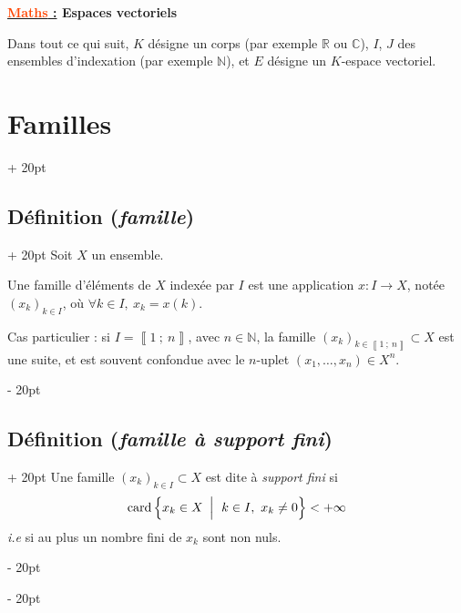\documentclass[a4paper, 12pt, twoside]{article}
\renewcommand{\emph}{\textcolor{ff4500}}
\newcommand{\N}{\mathbb{N}} %
\newcommand{\R}{\mathbb{R}} %
\newcommand{\C}{\mathbb{C}} %
\newcommand{\nset}[2]{\left\llbracket #1\ ;\ #2 \right\rrbracket}
\newcommand{\set}[1]{\left\{ #1 \right\}}
\newcommand{\ind}[1][20pt]{\advance\leftskip + #1}
\newcommand{\deind}[1][20pt]{\advance\leftskip - #1}
\newenvironment{indt}[2][20pt]{#2 \par \ind[#1]}{\par \deind} %
\newcommand{\thetitle}[2]{\begin{center}\textbf{{\LARGE \underline{\emph{#1} :}} {\Large #2}}\end{center}}
\begin{document}
    
    
    \thetitle{Maths}{Espaces vectoriels}
    
    \tableofcontents
    \newpage
    
    
    Dans tout ce qui suit, $K$ désigne un corps (par exemple $\R$ ou $\C$), $I$, $J$ des ensembles d'indexation (par exemple $\N$), et $E$ désigne un $K$-espace vectoriel.
    
    
    
    \begin{indt}{\section{Familles}}
        
        \begin{indt}{\subsection{Définition (\textit{famille})}}
            Soit $X$ un ensemble.
            
            Une famille d'éléments de $X$ indexée par $I$ est une application $x : I \longrightarrow X$, notée $(x_k)_{k \in I}$, où $\forall k \in I,\ x_k = x(k)$.
            
            \vspace{6pt}
            
            Cas particulier : si $I = \nset 1 n$, avec $n \in \N$, la famille $(x_k)_{k \in \nset 1 n} \subset X$ est une suite, et est souvent confondue avec le $n$-uplet $(x_1, \ldots, x_n) \in X^n$.
        \end{indt}
        
        \vspace{12pt}
        
        \begin{indt}{\subsection{Définition (\textit{famille à support fini})}}
            Une famille $(x_k)_{k \in I} \subset X$ est dite à \textit{support fini} si
                \[ \mathrm{card}\set{x_k \in X\ \left| \vphantom{\dfrac a a} \right.\ k \in I,\ x_k \neq 0} < +\infty \]
            \textit{i.e} si au plus un nombre fini de $x_k$ sont non nuls.
        \end{indt}
        

\end{indt}
\end{document}
